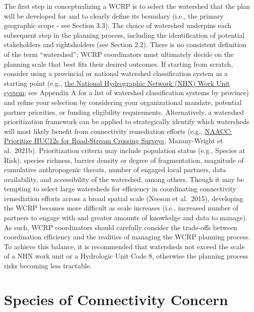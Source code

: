 \documentclass[
]{book}
\begin{document}
The first step in conceptualizing a WCRP is to select the watershed that the plan will be developed for and to clearly define its boundary (i.e., the primary geographic scope - see Section 3.3). The choice of watershed underpins each subsequent step in the planning process, including the identification of potential stakeholders and rightsholders (see Section 2.2). There is no consistent definition of the term ``watershed''; WCRP coordinators must ultimately decide on the planning scale that best fits their desired outcomes. If starting from scratch, consider using a provincial or national watershed classification system as a starting point (e.g., \href{https://www.nrcan.gc.ca/science-data/science-research/earth-sciences/geography/topographic-information/geobase-surface-water-program-ge/watershed-boundaries/20973}{the National Hydrographic Network (NHN) Work Unit system}; see Appendix A for a list of watershed classification systems by province) and refine your selection by considering your organizational mandate, potential partner priorities, or funding eligibility requirements. Alternatively, a watershed prioritization framework can be applied to strategically identify which watersheds will most likely benefit from connectivity remediation efforts (e.g., \href{https://drive.google.com/file/d/0B52wG1Pl2gRWNWptUjZ2ME15V3M/view}{NAACC: Prioritize HUC12s for Road-Stream Crossing Surveys}, Mazany-Wright et al.~2021b). Prioritization criteria may include population status (e.g., Species at Risk), species richness, barrier density or degree of fragmentation, magnitude of cumulative anthropogenic threats, number of engaged local partners, data availability, and accessibility of the watershed, among others. Though it may be tempting to select large watersheds for efficiency in coordinating connectivity remediation efforts across a broad spatial scale (Neeson et al.~2015), developing the WCRP becomes more difficult as scale increases (i.e., increased number of partners to engage with and greater amounts of knowledge and data to manage). As such, WCRP coordinators should carefully consider the trade-offs between coordination efficiency and the realities of managing the WCRP planning process. To achieve this balance, it is recommended that watersheds not exceed the scale of a NHN work unit or a Hydrologic Unit Code 8, otherwise the planning process risks becoming less tractable.

\hypertarget{species}{%
\section{Species of Connectivity Concern}\label{species}}
\end{document}
